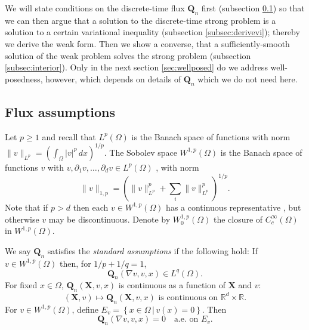 \documentclass[final,leqno,onefignum,onetabnum]{siamltex1213bueler}
\newcommand\bQ{\mathbf{Q}}
\newcommand\bX{\mathbf{X}}
\renewcommand{\grad}{\nabla}
\newcommand\RR{\mathbb{R}}
\begin{document}
We will state conditions on the discrete-time flux $\bQ_n$ first (subsection \ref{subsec:fluxassumptions}) so that we can then argue that a solution to the discrete-time strong problem is a solution to a certain variational inequality (subsection \ref{subsec:derivevi}); thereby we derive the weak form.  Then we show a converse, that a sufficiently-smooth solution of the weak problem solves the strong problem (subsection \ref{subsec:interior}).  Only in the next section \ref{sec:wellposed} do we address well-posedness, however, which depends on details of $\bQ_n$ which we do not need here.

\subsection{Flux assumptions} \label{subsec:fluxassumptions}  Let $p\ge 1$ and recall that $L^p (\Omega)$ is the Banach space of functions with norm $\|v\|_{L^p} = \left(\int_\Omega |v|^p\,dx\right)^{1/p}$.  The Sobolev space $W^{1,p}(\Omega)$ is the Banach space of functions $v$ with $v,\partial_1 v,\dots,\partial_d v \in L^p(\Omega)$ \cite{Evans1998}, with norm
\begin{equation}
  \|v\|_{1,p} = \left(\|v\|_{L^p}^p + \sum_i \|v\|_{L^p}^p\right)^{1/p}.  \label{eq:norm}
\end{equation}
Note that if $p>d$ then each $v\in W^{1,p}(\Omega)$ has a continuous representative \cite[``Morrey's inequality'']{Evans1998}, but otherwise $v$ may be discontinuous.  Denote by $W_0^{1,p}(\Omega)$ the closure of $C_c^\infty(\Omega)$ in $W^{1,p}(\Omega)$.

\medskip
\begin{definition}  \label{ass:std}  We say $\bQ_n$ satisfies the \emph{standard assumptions} if the following hold:  If $v \in W^{1,p}(\Omega)$ then, for $1/p + 1/q = 1$,
\begin{equation}
\bQ_n(\grad v,v,x) \in L^q(\Omega). \label{eq:QisLq}
\end{equation}
For fixed $x\in \Omega$, $\bQ_n(\bX,v,x)$ is continuous as a function of $\bX$ and $v$:
\begin{equation}
(\bX,v) \mapsto \bQ_n(\bX,v,x) \text{ is continuous on } \RR^d \times \RR.  \label{eq:Qiscontinuous}
\end{equation}
For $v \in W^{1,p}(\Omega)$, define $E_v = \left\{x\in\Omega \,\big|\, v(x) = 0\right\}$.  Then
\begin{equation}
\bQ_n(\grad v,v,x)=0 \quad \text{a.e.~on } E_v. \label{eq:Qiszero}
\end{equation}
\end{definition}
\end{document}
